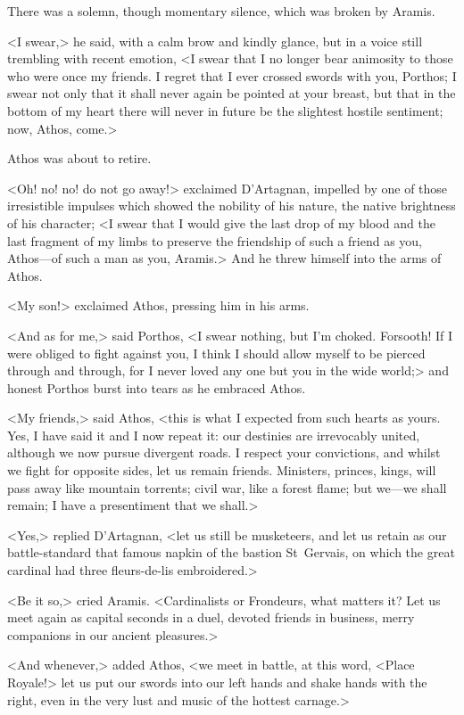 There was a solemn, though momentary silence, which was broken by Aramis.

<I swear,> he said, with a calm brow and kindly glance, but in a voice still trembling with recent emotion, <I swear that I no longer bear animosity to those who were once my friends. I regret that I ever crossed swords with you, Porthos; I swear not only that it shall never again be pointed at your breast, but that in the bottom of my heart there will never in future be the slightest hostile sentiment; now, Athos, come.>

Athos was about to retire.

<Oh! no! no! do not go away!> exclaimed D'Artagnan, impelled by one of those irresistible impulses which showed the nobility of his nature, the native brightness of his character; <I swear that I would give the last drop of my blood and the last fragment of my limbs to preserve the friendship of such a friend as you, Athos—of such a man as you, Aramis.> And he threw himself into the arms of Athos.

<My son!> exclaimed Athos, pressing him in his arms.

<And as for me,> said Porthos, <I swear nothing, but I'm choked. Forsooth! If I were obliged to fight against you, I think I should allow myself to be pierced through and through, for I never loved any one but you in the wide world;> and honest Porthos burst into tears as he embraced Athos.

<My friends,> said Athos, <this is what I expected from such hearts as yours. Yes, I have said it and I now repeat it: our destinies are irrevocably united, although we now pursue divergent roads. I respect your convictions, and whilst we fight for opposite sides, let us remain friends. Ministers, princes, kings, will pass away like mountain torrents; civil war, like a forest flame; but we—we shall remain; I have a presentiment that we shall.>

<Yes,> replied D'Artagnan, <let us still be musketeers, and let us retain as our battle-standard that famous napkin of the bastion St~Gervais, on which the great cardinal had three fleurs-de-lis embroidered.>

<Be it so,> cried Aramis. <Cardinalists or Frondeurs, what matters it? Let us meet again as capital seconds in a duel, devoted friends in business, merry companions in our ancient pleasures.>

<And whenever,> added Athos, <we meet in battle, at this word, <Place Royale!> let us put our swords into our left hands and shake hands with the right, even in the very lust and music of the hottest carnage.>

